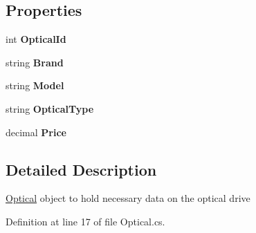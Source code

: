 \subsection*{Properties}
\begin{DoxyCompactItemize}
\item 
int {\bfseries Optical\+Id}\hypertarget{class_business_objects_1_1_optical_adfb18e4b3a7a16fc1cad290e29a706a0}{}\label{class_business_objects_1_1_optical_adfb18e4b3a7a16fc1cad290e29a706a0}

\item 
string {\bfseries Brand}\hypertarget{class_business_objects_1_1_optical_a39ba9566ba93a2d8e31ed1bfda850608}{}\label{class_business_objects_1_1_optical_a39ba9566ba93a2d8e31ed1bfda850608}

\item 
string {\bfseries Model}\hypertarget{class_business_objects_1_1_optical_ad4f96eedb36b6e8d0bb0a757d8c2f162}{}\label{class_business_objects_1_1_optical_ad4f96eedb36b6e8d0bb0a757d8c2f162}

\item 
string {\bfseries Optical\+Type}\hypertarget{class_business_objects_1_1_optical_afecc0495ac20fffeb10d11edcff6c3b6}{}\label{class_business_objects_1_1_optical_afecc0495ac20fffeb10d11edcff6c3b6}

\item 
decimal {\bfseries Price}\hypertarget{class_business_objects_1_1_optical_a3913208c58242f22d7aaa48fd0d3a54d}{}\label{class_business_objects_1_1_optical_a3913208c58242f22d7aaa48fd0d3a54d}

\end{DoxyCompactItemize}


\subsection{Detailed Description}
\hyperlink{class_business_objects_1_1_optical}{Optical} object to hold necessary data on the optical drive 



Definition at line 17 of file Optical.\+cs.



